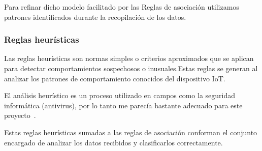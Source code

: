 Para refinar dicho modelo facilitado por las Reglas de asociación utilizamos patrones identificados durante la recopilación de los datos. 

\subsubsection{Reglas heurísticas}
Las reglas heurísticas son normas simples o criterios aproximados que se aplican para detectar comportamientos sospechosos o inusuales.Estas reglas se generan al analizar los patrones de comportamiento conocidos del dispositivo IoT.

El análisis heurístico es un proceso utilizado en campos como la seguridad informática (antivirus), por lo tanto me parecía bastante adecuado para este proyecto~\cite{Heu:Sec}.

Estas reglas heurísticas sumadas a las reglas de asociación conforman el conjunto encargado de analizar los datos recibidos y clasificarlos correctamente.












